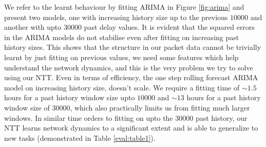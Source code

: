 We refer to the learnt behaviour by fitting ARIMA in Figure \ref{fig:arima} and present two models, one with increasing history size up to the previous $10000$ and another with upto $30000$ past delay values. It is evident that the squared errors in the ARIMA models do not stabilise even after fitting on increasing past history sizes. This shows that the structure in our packet data cannot be trivially learnt by just fitting on previous values, we need some features which help understand the network dynamics, and this is the very problem we try to solve using our NTT. Even in terms of efficiency, the one step rolling forecast ARIMA model on increasing history size, doesn't scale. We require a fitting time of ${\sim}1.5$ hours for a past history window size upto $10000$ and ${\sim}13$ hours for a past history window size of $30000$, which also practically limits us from fitting much larger windows. In similar time orders to fitting on upto the $30000$ past history, our NTT learns network dynamics to a significant extent and is able to generalize to new tasks (demonstrated in Table \ref{eval:table1}).

